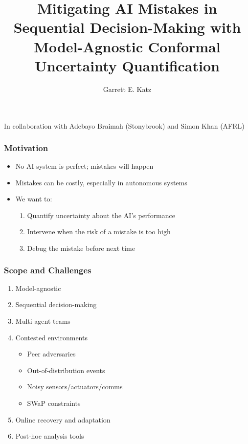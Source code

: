 \documentclass[handout]{beamer}
\title {Mitigating AI Mistakes in Sequential Decision-Making with Model-Agnostic Conformal Uncertainty Quantification}
\subtitle{}
\author{Garrett E. Katz}
\institute{Associate Professor, EECS, Syracuse University}
\date{}
\begin{document}
\begin{frame}
\titlepage

{\centering\footnotesize In collaboration with Adebayo Braimah (Stonybrook) and Simon Khan (AFRL)}

\end{frame}

\begin{frame}
\frametitle{Motivation}
\begin{itemize}
\item No AI system is perfect; mistakes will happen
\item Mistakes can be costly, especially in autonomous systems
\item We want to:
    \begin{enumerate}
    \item Quantify uncertainty about the AI's performance
    \item Intervene when the risk of a mistake is too high
    \item Debug the mistake before next time
    \end{enumerate}
\end{itemize}
\end{frame}

\begin{frame}
\frametitle{Scope and Challenges}
\begin{enumerate}
\item Model-agnostic \pause
\item Sequential decision-making \pause
\item Multi-agent teams \pause
\item Contested environments
    \begin{itemize}
    \item Peer adversaries
    \item Out-of-distribution events
    \item Noisy sensors/actuators/comms
    \item SWaP constraints
    \end{itemize} \pause
\item Online recovery and adaptation \pause
\item Post-hoc analysis tools
\end{enumerate}
\end{frame}
\end{document}

